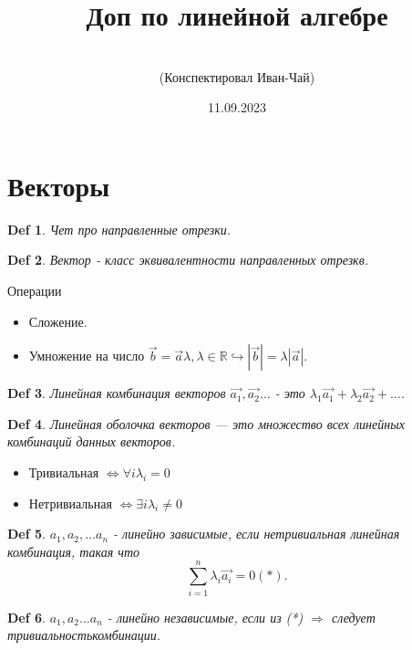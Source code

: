 \documentclass[a5paper, 10pt]{article}
\theoremstyle{plain}
\newtheorem{definition}{Def}
\newcommand{\R}{\mathbb R}
\newcommand{\hrarrow}{\hookrightarrow}
\newcommand{\Rarrow}{\Rightarrow}
\newcommand{\Lrarrow}{\Leftrightarrow}
\newcommand{\vec}{\overrightarrow}
\begin{document}
	\author{\\(Конспектировал Иван-Чай)}
	\date{11.09.2023}
	\title{Доп по линейной алгебре}

	\linespread{1.4}
	\selectfont

	\maketitle
	\newpage

	\tableofcontents

	\section{Векторы}

	\begin{definition}
	Чет про направленные отрезки.
	\end{definition}

	\begin{definition}
	Вектор - класс эквивалентности направленных отрезкв.
	\end{definition}

	Операции
	\begin{itemize}
	\item Сложение.
	\item Умножение на число $ \overrightarrow{b} = \overrightarrow{a} \lambda, \lambda \in \R
		\hrarrow | \overrightarrow{b} | = \lambda |\overrightarrow{a}|. $
	\end{itemize}

	\begin{definition}
	Линейная комбинация векторов $ \vec{a_1}, \vec{a_2} \dots $ - это
	$ \lambda_1 \vec{a_1} + \lambda_2 \vec{a_2} + \dots $.
	\end{definition}

	\begin{definition}
	Линейная оболочка векторов — это множество всех линейных комбинаций данных векторов.
	\end{definition}

	\begin{itemize}
	\item Тривиальная $ \Lrarrow \forall i \lambda_i = 0 $
	\item Нетривиальная $ \Lrarrow \exists i \lambda_i \neq 0 $
	\end{itemize}

	\begin{definition}
	$ a_1, a_2, \dots a_n $ - линейно зависимые, если нетривиальная линейная комбинация, такая что
	\[ %
		\sum_{i=1}^n \lambda_i \vec{a_i} = 0(*).
	\] %
	\end{definition}
	\begin{definition}
	$ a_1, a_2 \dots a_n $ - линейно независимые, если из (*) $ \Rarrow $ следует тривиальностькомбинации.
	\end{definition}
\end{document}
